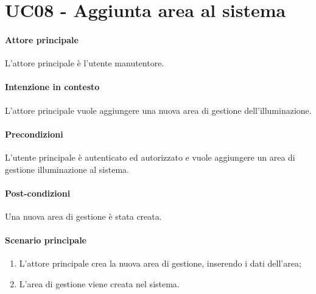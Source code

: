 \section{UC08 - Aggiunta area al sistema}

\paragraph{Attore principale} L'attore principale è l'utente manutentore.

\paragraph{Intenzione in contesto} L'attore principale vuole aggiungere una nuova area di gestione dell'illuminazione.


\paragraph{Precondizioni}
L'utente principale è autenticato ed autorizzato e vuole aggiungere un area di gestione illuminazione al sistema.

\paragraph{Post-condizioni}
Una nuova area di gestione è stata creata.

\paragraph{Scenario principale}
\begin{enumerate}
    \item L'attore principale crea la nuova area di gestione, inserendo i dati dell'area;
    \item L'area di gestione viene creata nel sistema.
\end{enumerate}
